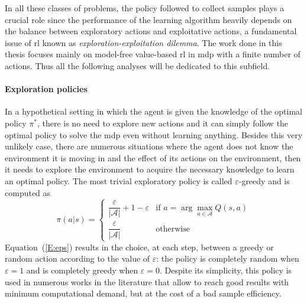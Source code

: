 In all these classes of problems, the policy followed to collect samples plays a crucial role since the performance of the learning algorithm heavily depends on the balance between exploratory actions and exploitative actions, a fundamental issue of \gls{rl} known as \textit{exploration-exploitation dilemma}. The work done in this thesis focuses mainly on model-free value-based \gls{rl} in \gls{mdp} with a finite number of actions. Thus all the following analyses will be dedicated to this subfield.

\paragraph{Exploration policies}
In a hypothetical setting in which the agent is given the knowledge of the optimal policy $\pi^*$, there is no need to explore new actions and it can simply follow the optimal policy to solve the \gls{mdp} even without learning anything. Besides this very unlikely case, there are numerous situations where the agent does not know the environment it is moving in and the effect of its actions on the environment, then it needs to explore the environment to acquire the necessary knowledge to learn an optimal policy. The most trivial exploratory policy is called $\varepsilon$-greedy and is computed as
\begin{equation}\label{E:eps}
\pi(a|s)=
    \begin{cases}
    \dfrac{\varepsilon}{|\mathcal{A}|} + 1 - \varepsilon & \text{if } a = \arg\max_{a \in \mathcal{A}}Q(s,a)\\
    \dfrac{\varepsilon}{|\mathcal{A}|} & \text{otherwise}
    \end{cases}
\end{equation}
Equation~(\ref{E:eps}) results in the choice, at each step, between a greedy or random action according to the value of $\varepsilon$: the policy is completely random when $\varepsilon = 1$ and is completely greedy when $\varepsilon = 0$.
Despite its simplicity, this policy is used in numerous works in the literature that allow to reach good results with minimum computational demand, but at the cost of a bad sample efficiency.

